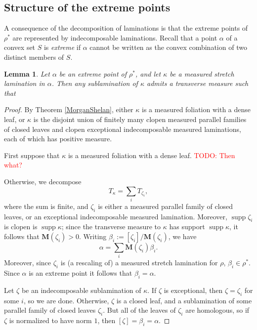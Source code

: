 \documentclass[reqno,11pt]{amsart}
\DeclareMathOperator{\supp}{supp}
\newcommand{\Mass}{\mathbf M}
\newcommand{\dfn}[1]{\emph{#1}\index{#1}}
\newtheorem{lemma}[theorem]{Lemma}
\theoremstyle{definition}
\numberwithin{equation}{section}
\newcommand\todo[1]{\textcolor{red}{TODO: #1}}
\begin{document}
\subsection{Structure of the extreme points}
A consequence of the decomposition of laminations is that the extreme points of $\rho^*$ are represented by indecomposable laminations.
Recall that a point $\alpha$ of a convex set $S$ is \dfn{extreme} if $\alpha$ cannot be written as the convex combination of two distinct members of $S$.

\begin{lemma}\label{extreme points are closed under sublaminations}
Let $\alpha$ be an extreme point of $\rho^*$, and let $\kappa$ be a measured stretch lamination in $\alpha$.
Then any sublamination of $\kappa$ admits a transverse measure such that 
\end{lemma}
\begin{proof}
By Theorem \ref{MorganShelan}, either $\kappa$ is a measured foliation with a dense leaf, or $\kappa$ is the disjoint union of finitely many clopen measured parallel families of closed leaves and clopen exceptional indecomposable measured laminations, each of which has positive measure.

First suppose that $\kappa$ is a measured foliation with a dense leaf. \todo{Then what?}

Otherwise, we decompose 
$$T_\kappa = \sum_i T_{\zeta_i},$$
where the sum is finite, and $\zeta_i$ is either a measured parallel family of closed leaves, or an exceptional indecomposable measured lamination.
Moreover, $\supp \zeta_i$ is clopen is $\supp \kappa$; since the transverse measure  to $\kappa$ has support $\supp \kappa$, it follows that $\Mass(\zeta_i) > 0$.
Writing $\beta_i := [\zeta_i]/\Mass(\zeta_i)$, we have
$$\alpha = \sum_i \Mass(\zeta_i) \beta_i.$$
Moreover, since $\zeta_i$ is (a rescaling of) a measured stretch lamination for $\rho$, $\beta_i \in \rho^*$.
Since $\alpha$ is an extreme point it follows that $\beta_i = \alpha$.

Let $\zeta$ be an indecomposable sublamination of $\kappa$.
If $\zeta$ is exceptional, then $\zeta = \zeta_i$ for some $i$, so we are done.
Otherwise, $\zeta$ is a closed leaf, and a sublamination of some parallel family of closed leaves $\zeta_i$.
But all of the leaves of $\zeta_i$ are homologous, so if $\zeta$ is normalized to have norm $1$, then $[\zeta] = \beta_i = \alpha$.
\end{proof}
\end{document}
